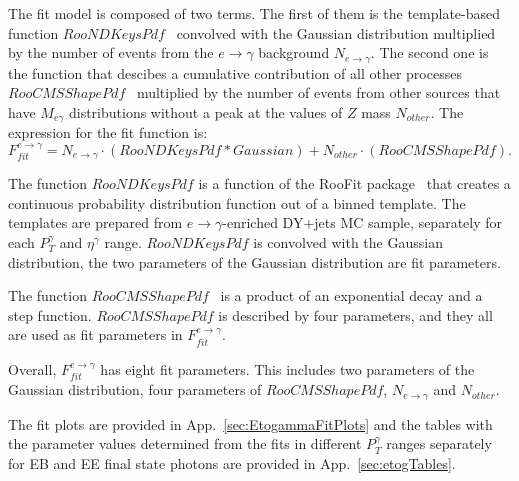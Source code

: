 The fit model is composed of two terms. The first of them is the template-based function $RooNDKeysPdf$~\cite{ref_RooFit} convolved with the Gaussian distribution multiplied by the number of events from the $e\rightarrow\gamma$ background  $N_{e\rightarrow\gamma}$. The second one is the function that descibes a cumulative contribution of all other processes $RooCMSShapePdf$~\cite{ref_RooCMSShapePdf} multiplied by the number of events from other sources that have $M_{e\gamma}$ distributions without a peak at the values of $Z$ mass $N_{other}$. The expression for the fit function is:
\begin{equation}\label{eq:fit_function_etog}
F_{fit}^{e\rightarrow\gamma} = N_{e\rightarrow\gamma} \cdot (RooNDKeysPdf \ast Gaussian) +  N_{other} \cdot (RooCMSShapePdf).
\end{equation}

The function $RooNDKeysPdf$ is a function of the RooFit package~\cite{ref_RooFit} that creates a continuous probability distribution function out of a binned template. The templates are prepared from $e\rightarrow\gamma$-enriched DY+jets MC sample, separately for each $P_T^{\gamma}$ and $\eta^\gamma$ range. $RooNDKeysPdf$ is convolved with the Gaussian distribution, the two parameters of the Gaussian distribution are fit parameters. 

The function $RooCMSShapePdf$~\cite{ref_RooCMSShapePdf} is a product of an exponential decay and a step function. $RooCMSShapePdf$ is described by four parameters, and they all are used as fit parameters in $F_{fit}^{e\rightarrow\gamma}$. 

Overall,  $F_{fit}^{e\rightarrow\gamma}$ has eight fit parameters. This includes two parameters of the Gaussian distribution, four parameters of $RooCMSShapePdf$, $N_{e\rightarrow\gamma}$ and $N_{other}$.

The fit plots are provided in App.~\ref{sec:EtogammaFitPlots} and the tables with the parameter values determined from the fits in different $P_T^{\gamma}$ ranges separately for EB and EE final state photons are provided in App.~\ref{sec:etogTables}.


